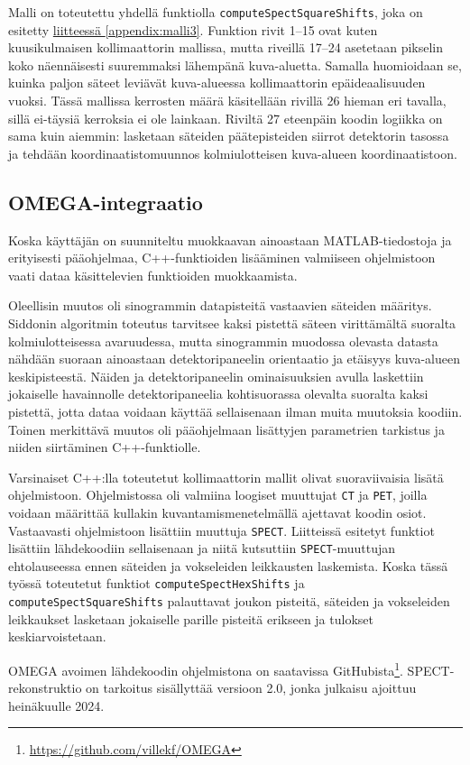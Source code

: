 Malli on toteutettu yhdellä funktiolla \texttt{computeSpectSquareShifts}, joka on esitetty \hyperref[appendix:malli3]{liitteessä \ref*{appendix:malli3}}. Funktion rivit 1--15 ovat kuten kuusikulmaisen kollimaattorin mallissa, mutta riveillä 17--24 asetetaan pikselin koko näennäisesti suuremmaksi lähempänä kuva-aluetta. Samalla huomioidaan se, kuinka paljon säteet leviävät kuva-alueessa kollimaattorin epäideaalisuuden vuoksi. Tässä mallissa kerrosten määrä käsitellään rivillä 26 hieman eri tavalla, sillä ei-täysiä kerroksia ei ole lainkaan. Riviltä 27 eteenpäin koodin logiikka on sama kuin aiemmin: lasketaan säteiden päätepisteiden siirrot detektorin tasossa ja tehdään koordinaatistomuunnos kolmiulotteisen kuva-alueen koordinaatistoon.

\subsection{OMEGA-integraatio}
Koska käyttäjän on suunniteltu muokkaavan ainoastaan MATLAB-tiedostoja ja erityisesti pääohjelmaa, C++-funktioiden lisääminen valmiiseen ohjelmistoon vaati dataa käsittelevien funktioiden muokkaamista.

Oleellisin muutos oli sinogrammin datapisteitä vastaavien säteiden määritys. Siddonin algoritmin toteutus tarvitsee kaksi pistettä säteen virittämältä suoralta kolmiulotteisessa avaruudessa, mutta sinogrammin muodossa olevasta datasta nähdään suoraan ainoastaan detektoripaneelin orientaatio ja etäisyys kuva-alueen keskipisteestä. Näiden ja detektoripaneelin ominaisuuksien avulla laskettiin jokaiselle havainnolle detektoripaneelia kohtisuorassa olevalta suoralta kaksi pistettä, jotta dataa voidaan käyttää sellaisenaan ilman muita muutoksia koodiin. Toinen merkittävä muutos oli pääohjelmaan lisättyjen parametrien tarkistus ja niiden siirtäminen C++-funktiolle.

Varsinaiset C++:lla toteutetut kollimaattorin mallit olivat suoraviivaisia lisätä ohjelmistoon. Ohjelmistossa oli valmiina loogiset muuttujat \texttt{CT} ja \texttt{PET}, joilla voidaan määrittää kullakin kuvantamismenetelmällä ajettavat koodin osiot. Vastaavasti ohjelmistoon lisättiin muuttuja \texttt{SPECT}. Liitteissä esitetyt funktiot lisättiin lähdekoodiin sellaisenaan ja niitä kutsuttiin \texttt{SPECT}-muuttujan ehtolauseessa ennen säteiden ja vokseleiden leikkausten laskemista. Koska tässä työssä toteutetut funktiot \texttt{computeSpectHexShifts} ja \texttt{computeSpectSquareShifts} palauttavat joukon pisteitä, säteiden ja vokseleiden leikkaukset lasketaan jokaiselle parille pisteitä erikseen ja tulokset keskiarvoistetaan.

OMEGA avoimen lähdekoodin ohjelmistona on saatavissa GitHubista\footnote{\url{https://github.com/villekf/OMEGA}}. SPECT-rekonstruktio on tarkoitus sisällyttää versioon 2.0, jonka julkaisu ajoittuu heinäkuulle 2024.
